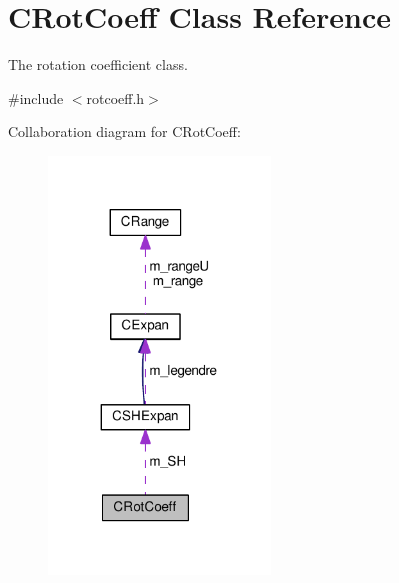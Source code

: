 \hypertarget{classCRotCoeff}{\section{C\-Rot\-Coeff Class Reference}
\label{classCRotCoeff}
}


The rotation coefficient class.  




{\ttfamily \#include $<$rotcoeff.\-h$>$}



Collaboration diagram for C\-Rot\-Coeff\-:\nopagebreak
\begin{figure}[H]
\begin{center}
\leavevmode
\includegraphics[width=167pt]{classCRotCoeff__coll__graph}
\end{center}
\end{figure}
